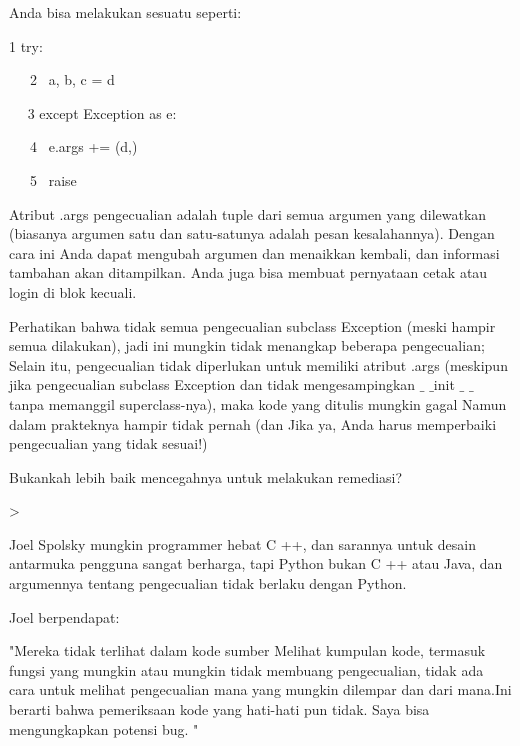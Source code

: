 \vspace{12pt}
Anda bisa melakukan sesuatu seperti: \par
\vspace{12pt}
1 try: \par
~~~2~  a, b, c = d \par
~~ 3 except Exception as e: \par
~~~4~  e.args += (d,) \par
~~~5~  raise \par
\vspace{12pt}
Atribut .args pengecualian adalah tuple dari semua argumen yang dilewatkan (biasanya argumen satu dan satu-satunya adalah pesan kesalahannya). Dengan cara ini Anda dapat mengubah argumen dan menaikkan kembali, dan informasi tambahan akan ditampilkan. Anda juga bisa membuat pernyataan cetak atau login di blok kecuali. \par
\vspace{12pt}
Perhatikan bahwa tidak semua pengecualian subclass Exception (meski hampir semua dilakukan), jadi ini mungkin tidak menangkap beberapa pengecualian; Selain itu, pengecualian tidak diperlukan untuk memiliki atribut .args (meskipun jika pengecualian subclass Exception dan tidak mengesampingkan  $  \_  $ $  \_  $init $  \_  $ $  \_  $ tanpa memanggil superclass-nya), maka kode yang ditulis mungkin gagal Namun dalam prakteknya hampir tidak pernah (dan Jika ya, Anda harus memperbaiki pengecualian yang tidak sesuai!) \par
\vspace{12pt}
Bukankah lebih baik mencegahnya untuk melakukan remediasi? \par
\vspace{12pt}
>  \par
\vspace{12pt}
Joel Spolsky mungkin programmer hebat C ++, dan sarannya untuk desain antarmuka pengguna sangat berharga, tapi Python bukan C ++ atau Java, dan argumennya tentang pengecualian tidak berlaku dengan Python. \par
\vspace{12pt}
Joel berpendapat: \par
\vspace{12pt}
"Mereka tidak terlihat dalam kode sumber Melihat kumpulan kode, termasuk fungsi yang mungkin atau mungkin tidak membuang pengecualian, tidak ada cara untuk melihat pengecualian mana yang mungkin dilempar dan dari mana.Ini berarti bahwa pemeriksaan kode yang hati-hati pun tidak. Saya bisa mengungkapkan potensi bug. " \par
